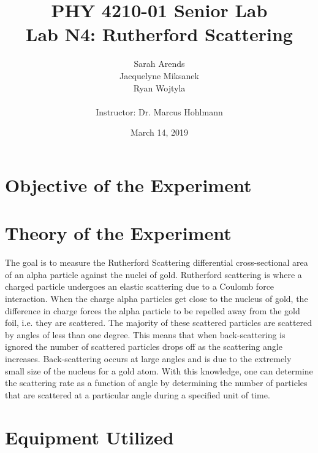 \documentclass[a4paper]{article}
\title{PHY 4210-01 Senior Lab \\Lab N4: Rutherford Scattering}
\author{Sarah Arends \\ 
        Jacquelyne Miksanek \\
        Ryan Wojtyla \\ \\
        Instructor: Dr. Marcus Hohlmann}
\date{March 14, 2019}
\begin{document}
\maketitle 

\begin{abstract}
  \qq 
\end{abstract}

\newpage

\tableofcontents

\newpage

\section{Objective of the Experiment}
\qq 

\section{Theory of the Experiment}

\qq The goal is to measure the Rutherford Scattering differential
cross-sectional area of an alpha particle against the nuclei of
gold. Rutherford scattering is where a charged particle undergoes an
elastic scattering due to a Coulomb force interaction. When the charge
alpha particles get close to the nucleus of gold, the difference in
charge forces the alpha particle to be repelled away from the gold
foil, i.e. they are scattered. The majority of these scattered
particles are scattered by angles of less than one degree. This means
that when back-scattering is ignored the number of scattered particles
drops off as the scattering angle increases. Back-scattering occurs at
large angles and is due to the extremely small size of the nucleus for
a gold atom. With this knowledge, one can determine the scattering
rate as a function of angle by determining the number of particles
that are scattered at a particular angle during a specified unit of
time.


\qq 

\section{Equipment Utilized}
\end{document}
